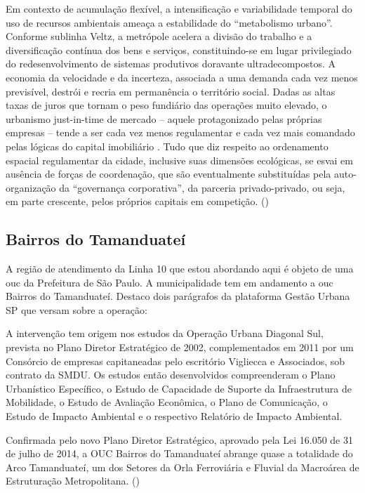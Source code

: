 \documentclass[11pt,fleqn]{book} %
\begin{document}
\begin{citacao}
	Em contexto de acumulação flexível, a intensificação e variabilidade temporal do uso de recursos ambientais ameaça a estabilidade do “metabolismo urbano”. Conforme sublinha Veltz, a metrópole acelera a divisão do trabalho e a diversificação contínua dos bens e serviços, constituindo-se em lugar privilegiado do redesenvolvimento de sistemas produtivos doravante ultradecompostos. A economia da velocidade e da incerteza, associada a uma demanda cada vez menos previsível, destrói e recria em permanência o território social. Dadas as altas taxas de juros que tornam o peso fundiário das operações muito elevado, o urbanismo just-in-time de mercado – aquele protagonizado pelas próprias empresas – tende a ser cada vez menos regulamentar e cada vez mais comandado pelas	lógicas do capital imobiliário \cite{Acselrad}. Tudo que diz respeito ao ordenamento espacial regulamentar da cidade, inclusive suas dimensões ecológicas, se esvai em ausência de forças de coordenação, que são eventualmente substituídas pela auto-organização da	“governança corporativa”, da parceria privado-privado, ou seja, em parte crescente, pelos próprios capitais em competição.
	(\cite[pág. 31]{Acselrad})
\end{citacao}

\subsection{Bairros do Tamanduateí}

A região de atendimento da Linha 10 que estou abordando aqui é objeto de uma \gls{ouc} da Prefeitura de São Paulo. A municipalidade tem em andamento a \gls{ouc} Bairros do Tamanduateí. Destaco dois parágrafos da plataforma Gestão Urbana SP que versam sobre a operação:

\begin{citacao}
	A intervenção tem origem nos estudos da Operação Urbana Diagonal Sul, prevista no Plano Diretor Estratégico de 2002, complementados em 2011 por um Consórcio de empresas capitaneadas pelo escritório Vigliecca e Associados, sob contrato da SMDU. Os estudos então desenvolvidos compreenderam o Plano Urbanístico Específico, o Estudo de Capacidade de Suporte da Infraestrutura de Mobilidade, o Estudo de Avaliação Econômica, o Plano de Comunicação, o Estudo de Impacto Ambiental e o respectivo Relatório de Impacto Ambiental.
	
	Confirmada pelo novo Plano Diretor Estratégico, aprovado pela Lei 16.050 de 31 de julho de 2014, a OUC Bairros do Tamanduateí abrange quase a totalidade do Arco Tamanduateí, um dos Setores da Orla Ferroviária e Fluvial da Macroárea de Estruturação Metropolitana.
	(\cite{smdu})
\end{citacao}
\end{document}

